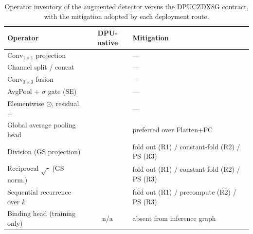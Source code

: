 \documentclass[onecolumn,journal]{IEEEtran}
\newcommand{\cmark}{\ding{51}}
\newcommand{\xmark}{\ding{55}}
\newcommand{\Conv}{\mathrm{Conv}}
\begin{document}
\begin{table}[t]
\centering
\caption{Operator inventory of the augmented detector versus the DPUCZDX8G contract,
with the mitigation adopted by each deployment route.}
\label{tab:ops}
\setlength{\tabcolsep}{5pt}
\renewcommand{\arraystretch}{1.2}
\begin{tabular}{lcl}
\toprule
Operator & DPU-native & Mitigation\\
\midrule
$\Conv_{1\times1}$ projection            & \cmark & ---\\
Channel split / concat                   & \cmark & ---\\
$\Conv_{3\times3}$ fusion                & \cmark & ---\\
AvgPool + $\sigma$ gate (SE)             & \cmark & ---\\
Elementwise $\odot$, residual $+$        & \cmark & ---\\
Global average pooling head              & \cmark & preferred over Flatten+FC \cite{amd_pg338}\\
\midrule
Division (GS projection)                 & \xmark & fold out (R1) / constant-fold (R2) / PS (R3)\\
Reciprocal $\sqrt{\cdot}$ (GS norm.)     & \xmark & fold out (R1) / constant-fold (R2) / PS (R3)\\
Sequential recurrence over $k$           & \xmark & fold out (R1) / precompute (R2) / PS (R3)\\
Binding head (training only)             & n/a    & absent from inference graph\\
\bottomrule
\end{tabular}
\end{table}
\end{document}
